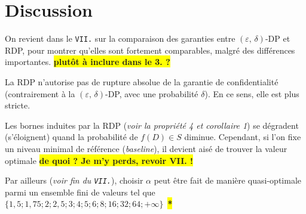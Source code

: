 \documentclass[a4paper,11pt]{article} %
\newcommand{\ttt}[1]{\texttt{#1}}
\newcommand{\rem}[1]{\colorbox{yellow}{\textbf{#1}}}
\newcommand{\REM}[1]{\colorbox{yellow}{\color{red}\textbf{#1}}}
\begin{document}
\section{Discussion}
On revient dans le \ttt{VII.} sur la comparaison des garanties entre $(\varepsilon,\,\delta)$-DP et RDP, pour montrer qu'elles sont fortement comparables, malgré des différences importantes. \rem{plutôt à inclure dans le 3. ?}

La RDP n'autorise pas de rupture absolue de la garantie de confidentialité (contrairement à la $(\varepsilon,\,\delta)$-DP, avec une probabilité $\delta$). En ce sens, elle est plus stricte. 

Les bornes induites par la RDP (\emph{voir la propriété 4 et corollaire 1}) se dégradent (s'éloignent) quand la probabilité de $f(D)\in S$ diminue. Cependant, si l'on fixe un niveau minimal de référence (\emph{baseline}), il devient aisé de trouver la valeur optimale \rem{de quoi ? Je m'y perds, revoir VII. !}

Par ailleurs (\emph{voir fin du \ttt{VII.}}), choisir $\alpha$ peut être fait de manière quasi-optimale parmi un ensemble fini de valeurs tel que\\$\{ 1,5 ; 1,75 ; 2 ; 2,5 ; 3 ; 4 ; 5 ; 6 ; 8 ; 16 ; 32 ; 64 ; +\infty \}$~\REM{*}

\end{document}
